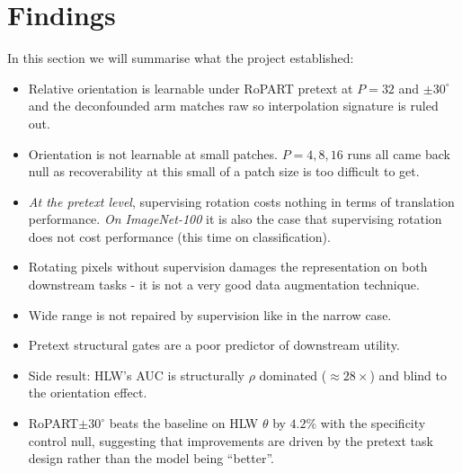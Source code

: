\documentclass[final_report.tex]{subfiles}
\begin{document}
\label{ch:conclusion}

\section{Findings}\label{sec:findings}
In this section we will summarise what the project established:
\begin{itemize}
\item Relative orientation is learnable under RoPART pretext at $P=32$ and $\pm30^\circ$ and the deconfounded arm matches raw so interpolation signature is ruled out.
\item Orientation is not learnable at small patches. $P=4,8,16$ runs all came back null as recoverability at this small of a patch size is too difficult to get.
\item \emph{At the pretext level}, supervising rotation costs nothing in terms of translation performance. \emph{On ImageNet-100} it is also the case that supervising rotation does not cost performance (this time on classification).
\item Rotating pixels without supervision damages the representation on both downstream tasks - it is not a very good data augmentation technique.
\item Wide range is not repaired by supervision like in the narrow case.
\item Pretext structural gates are a poor predictor of downstream utility.
\item Side result: HLW's AUC is structurally $\rho$ dominated ($\approx 28\times$) and blind to the orientation effect.
\item RoPART$\pm30^\circ$ beats the baseline on HLW $\theta$ by $4.2\%$ with the specificity control null, suggesting that improvements are driven by the pretext task design rather than the model being ``better''.
\end{itemize}
\end{document}
